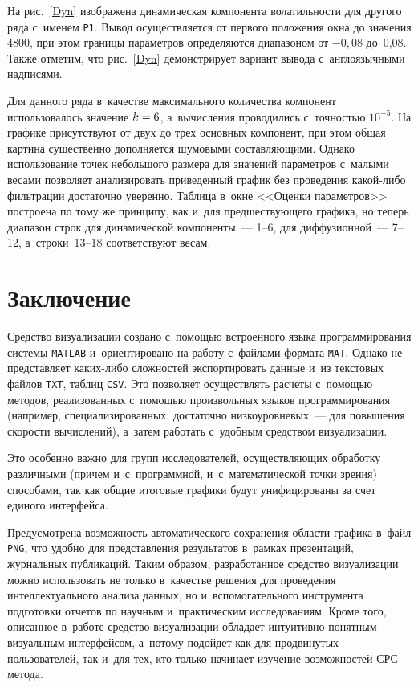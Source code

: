 \begin{multicols}{2}
На рис.~\ref{Dyn} изображена динамическая компонента волатильности для другого ряда с~именем
\verb"P1". Вывод осуществляется от первого положения окна до значения 4800, при этом границы
параметров определяются диапазоном от $-0{,}08$ до~0,08. Также отметим, что рис.~\ref{Dyn}
демонстрирует вариант вывода с~англоязычными надписями.



Для данного ряда в~качестве максимального количества компонент использовалось значение
$k\hm=6$, а~вычисления
проводились с~точ\-ностью $10^{-5}$. На графике присутствуют от двух до трех основных компонент, при
этом общая картина существенно дополняется шумовыми составляющими. Однако использование точек
небольшого размера для значений параметров с~малыми весами позволяет анализировать приведенный график
без проведения какой-либо фильтрации достаточно уверенно. Таблица в~окне <<Оценки параметров>>
построена по тому же принципу, как и~для предшествующего графика, но теперь диапазон строк для
динамической компоненты~--- 1--6, для диффузионной~--- 7--12, а~строки~13--18
соответствуют весам.

\section{Заключение}

Средство визуализации создано с~помощью встроенного языка программирования системы \verb"MATLAB" и~ориентировано на работу с~файлами формата \verb"MAT". Однако  не представляет каких-либо сложностей
экспортировать данные и~из текстовых файлов \verb"TXT", таблиц \verb"CSV".
Это позволяет осуществлять
расчеты с~помощью методов, реализованных с~помощью произвольных языков программирования (например,
специализированных, достаточно низкоуровневых~--- для повышения скорости вычислений), а~затем работать
с~удобным средством визуализации.

Это особенно важно для групп исследователей, осуществляющих
обработку различными (причем и~с~программной, и~с~математической точки зрения) способами, так как
общие итоговые графики будут унифицированы за счет единого интерфейса.

Предусмотрена возможность автоматического сохранения области графика в~файл \verb"PNG", что удобно
для представления результатов в~рамках презентаций, журнальных публикаций. Таким образом,
разработанное средство визуализации можно использовать не только в~качестве решения для проведения
интеллектуального анализа данных, но и~вспомогательного инструмента подготовки отчетов по научным и~практическим исследованиям. Кроме того, описанное в~работе средство визуализации обладает интуитивно
понятным визуальным интерфейсом, а~потому подойдет как для продвинутых пользователей, так и~для тех,
кто только начинает изучение возможностей СРС-метода.


\end{multicols}
